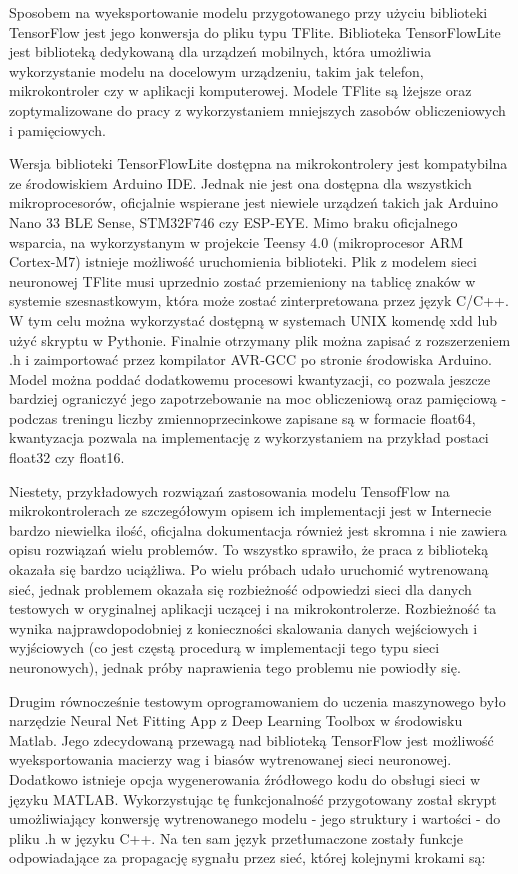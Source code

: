 \documentclass[12pt, a4paper]{article}
\begin{document}
Sposobem na wyeksportowanie modelu przygotowanego przy użyciu biblioteki TensorFlow jest jego konwersja do pliku typu TFlite. Biblioteka TensorFlowLite jest biblioteką dedykowaną dla urządzeń mobilnych, która umożliwia wykorzystanie modelu na docelowym urządzeniu, takim jak telefon, mikrokontroler czy w aplikacji komputerowej. Modele TFlite są lżejsze oraz zoptymalizowane do pracy z wykorzystaniem mniejszych zasobów obliczeniowych i pamięciowych.

Wersja biblioteki TensorFlowLite dostępna na mikrokontrolery jest kompatybilna ze środowiskiem Arduino IDE. Jednak nie jest ona dostępna dla wszystkich mikroprocesorów, oficjalnie wspierane jest niewiele urządzeń takich jak Arduino Nano 33 BLE Sense, STM32F746 czy ESP-EYE. Mimo braku oficjalnego wsparcia, na wykorzystanym w projekcie Teensy 4.0 (mikroprocesor ARM Cortex-M7) istnieje możliwość uruchomienia biblioteki. Plik z modelem sieci neuronowej TFlite musi uprzednio zostać przemieniony na tablicę znaków w systemie szesnastkowym, która może zostać zinterpretowana przez język C/C++. W tym celu można wykorzystać dostępną w systemach UNIX komendę xdd lub użyć skryptu w Pythonie. Finalnie otrzymany plik można zapisać z rozszerzeniem .h i zaimportować przez kompilator AVR-GCC po stronie środowiska Arduino. Model można poddać dodatkowemu procesowi kwantyzacji, co pozwala jeszcze bardziej ograniczyć jego zapotrzebowanie na moc obliczeniową oraz pamięciową - podczas treningu liczby zmiennoprzecinkowe zapisane są w formacie float64, kwantyzacja pozwala na implementację z wykorzystaniem na przykład postaci float32 czy float16.

Niestety, przykładowych rozwiązań zastosowania modelu TensofFlow na mikrokontrolerach ze szczegółowym opisem ich implementacji jest w Internecie bardzo niewielka ilość, oficjalna dokumentacja również jest skromna i nie zawiera opisu rozwiązań wielu problemów. To wszystko sprawiło, że praca z biblioteką okazała się bardzo uciążliwa. Po wielu próbach udało uruchomić wytrenowaną sieć, jednak problemem okazała się rozbieżność odpowiedzi sieci dla danych testowych w oryginalnej aplikacji uczącej i na mikrokontrolerze. Rozbieżność ta wynika najprawdopodobniej z konieczności skalowania danych wejściowych i wyjściowych (co jest częstą procedurą w implementacji tego typu sieci neuronowych), jednak próby naprawienia tego problemu nie powiodły się. 

Drugim równocześnie testowym oprogramowaniem do uczenia maszynowego było narzędzie Neural Net Fitting App z Deep Learning Toolbox w środowisku Matlab. Jego zdecydowaną przewagą nad biblioteką TensorFlow jest możliwość wyeksportowania macierzy wag i biasów wytrenowanej sieci neuronowej. Dodatkowo istnieje opcja wygenerowania źródłowego kodu do obsługi sieci w języku MATLAB. Wykorzystując tę funkcjonalność przygotowany został skrypt umożliwiający konwersję wytrenowanego modelu - jego struktury i wartości - do pliku .h w języku C++. Na ten sam język przetłumaczone zostały funkcje odpowiadające za propagację sygnału przez sieć, której kolejnymi krokami są:
\end{document}

